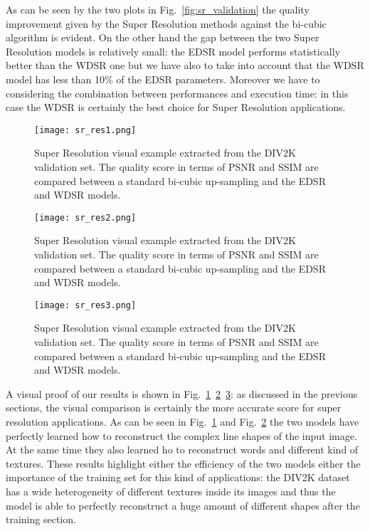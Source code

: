 \documentclass{standalone}
\begin{document}
As can be seen by the two plots in Fig.~\ref{fig:sr_validation} the quality improvement given by the Super Resolution methods against the bi-cubic algorithm is evident.
On the other hand the gap between the two Super Resolution models is relatively small: the EDSR model performs statistically better than the WDSR one but we have also to take into account that the WDSR model has less than 10\% of the EDSR parameters.
Moreover we have to considering the combination between performances and execution time: in this case the WDSR is certainly the best choice for Super Resolution applications.

\begin{figure}[htbp]
\centering
\texttt{[image: sr\_res1.png]}
\caption{Super Resolution visual example extracted from the DIV2K validation set.
The quality score in terms of PSNR and SSIM are compared between a standard bi-cubic up-sampling and the EDSR and WDSR models.
}
\label{fig:sr_ex1}
\end{figure}

\begin{figure}[htbp]
\centering
\texttt{[image: sr\_res2.png]}
\caption{Super Resolution visual example extracted from the DIV2K validation set.
The quality score in terms of PSNR and SSIM are compared between a standard bi-cubic up-sampling and the EDSR and WDSR models.
}
\label{fig:sr_ex2}
\end{figure}

\begin{figure}[htbp]
\centering
\texttt{[image: sr\_res3.png]}
\caption{Super Resolution visual example extracted from the DIV2K validation set.
The quality score in terms of PSNR and SSIM are compared between a standard bi-cubic up-sampling and the EDSR and WDSR models.
}
\label{fig:sr_ex3}
\end{figure}

A visual proof of our results is shown in Fig.~\ref{fig:sr_ex1}~\ref{fig:sr_ex2}~\ref{fig:sr_ex3}: as discussed in the previous sections, the visual comparison is certainly the more accurate score for super resolution applications.
As can be seen in Fig.~\ref{fig:sr_ex1} and Fig.~\ref{fig:sr_ex2} the two models have perfectly learned how to reconstruct the complex line shapes of the input image.
At the same time they also learned ho to reconstruct words and different kind of textures.
These results highlight either the efficiency of the two models either the importance of the training set for this kind of applications: the DIV2K dataset has a wide heterogeneity of different textures inside its images and thus the model is able to perfectly reconstruct a huge amount of different shapes after the training section.
\end{document}
